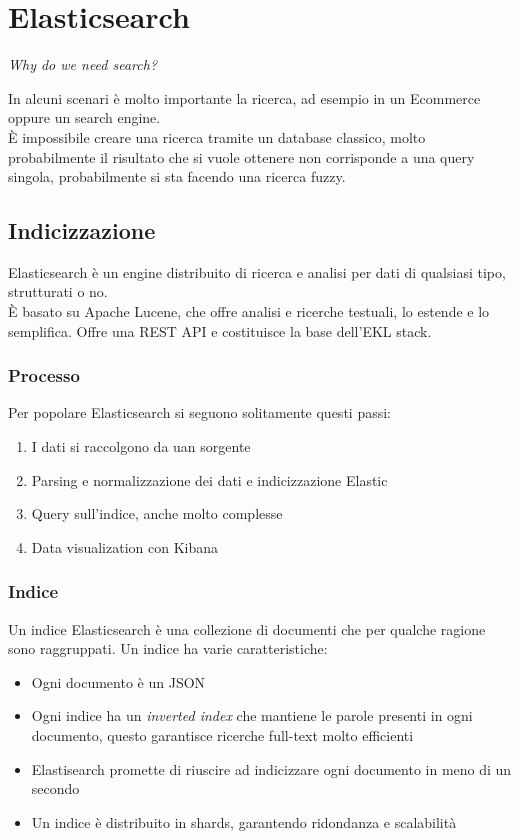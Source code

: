\section{Elasticsearch}
\begin{center}
    \emph{Why do we need search?}
\end{center}
In alcuni scenari è molto importante la ricerca, ad esempio in un Ecommerce oppure
un search engine.\\
È impossibile creare una ricerca tramite un database classico, molto probabilmente
il risultato che si vuole ottenere non corrisponde a una query singola, probabilmente
si sta facendo una ricerca fuzzy.

\subsection{Indicizzazione}
Elasticsearch è un engine distribuito di ricerca e analisi per dati di qualsiasi tipo, 
strutturati o no.\\
È basato su Apache Lucene, che offre analisi e ricerche testuali, lo estende e lo semplifica.
Offre una REST API e costituisce la base dell'EKL stack.

\subsubsection{Processo}
Per popolare Elasticsearch si seguono solitamente questi passi:
\begin{enumerate}
    \item I dati si raccolgono da uan sorgente
    \item Parsing e normalizzazione dei dati e indicizzazione Elastic
    \item Query sull'indice, anche molto complesse
    \item Data visualization con Kibana
\end{enumerate}

\subsubsection{Indice}
Un indice Elasticsearch è una collezione di documenti che per qualche ragione sono raggruppati.
Un indice ha varie caratteristiche:
\begin{itemize}
    \item Ogni documento è un JSON
    \item Ogni indice ha un \emph{inverted index} che mantiene le parole presenti in ogni documento, 
    questo garantisce ricerche full-text molto efficienti
    \item Elastisearch promette di riuscire ad indicizzare ogni documento in meno di un secondo
    \item Un indice è distribuito in shards, garantendo ridondanza e scalabilità
\end{itemize}

